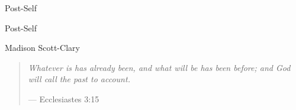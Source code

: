\documentclass[10pt]{memoir}
\begin{document}
  \nopartblankpage
  \makeatletter
  \renewcommand*{\beforepartskip}{\null\vfill\thispagestyle{empty}}
  \renewcommand*{\afterpartskip}{\par\vskip1cm%
  \@afterindentfalse\@afterheading}
  \makeatother
  \setcounter{part}{0}

  \frontmatter

  \thispagestyle{empty}
  \null
  \vfill
  \begin{flushright}
    \DisplayFont Post-Self
  \end{flushright}
  \vfill
  \cleardoublepage

  \pagestyle{plain}


  \begin{flushright}
    \null
    \vfill
    {\Huge\DisplayFont Post-Self}

    \vfill

    {\Large\DisplayFont Madison Scott-Clary}
  \end{flushright}
  \pagestyle{empty}

  \newpage

  

  \cleartoverso
  \setcounter{tocdepth}{-1}
  \tableofcontents*
  \newpage
  \null
  \cleardoublepage

  \mainmatter

  \pagestyle{ourbook}

  \cleardoublepage

  \null
  \thispagestyle{empty}
  \vfill
  \begin{quote}
    \emph{Whatever is has already been, and what will be has been \mbox{before;} and God will call the past to account.}

    --- Ecclesiastes 3:15
  \end{quote}
  \vfill
  
\end{document}
